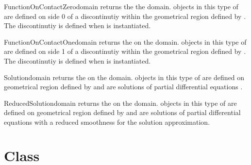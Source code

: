 \begin{funcdesc}{FunctionOnContactZero}{domain}
returns the \FunctionOnContactZero the \Domain domain. \Data objects in this type of \Function
are defined on side 0 of a discontinutiy  within the geometrical region defined by .
The discontinutiy is defined when  is instantiated.
\end{funcdesc}

\begin{funcdesc}{FunctionOnContactOne}{domain}
returns the \FunctionOnContactOne on the \Domain domain. 
\Data objects in this type of \Function
are defined on side 1 of a discontinutiy  within the geometrical region defined by .
The discontinutiy is defined when  is instantiated.
\end{funcdesc}

\begin{funcdesc}{Solution}{domain}
returns the \SolutionFS on the \Domain domain. \Data objects in this type of \Function
are defined on geometrical region defined by  and are solutions of
partial differential equations . 
\end{funcdesc}

\begin{funcdesc}{ReducedSolution}{domain}
returns the \ReducedSolutionFS on the \Domain domain. \Data objects in this type of \Function
are defined on geometrical region defined by  and are solutions of
partial differential equations  with a reduced smoothness 
for the solution approximation.
\end{funcdesc}

\section{\Data Class}
\label{SEC ESCRIPT DATA}

